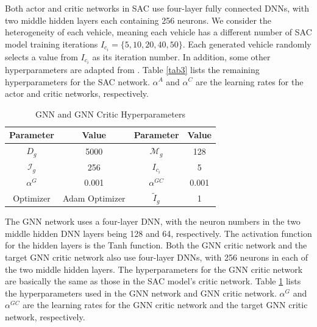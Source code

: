 \documentclass[lettersize,journal,onecolumn]{IEEEtran}
\begin{document}
Both actor and critic networks in SAC use four-layer fully connected DNNs, with two middle hidden layers each containing 256 neurons. We consider the heterogeneity of each vehicle, meaning each vehicle has a different number of SAC model training iterations ${{I}_{{{c}_{i}}}}=\{5,10,20,40,50\}$. Each generated vehicle randomly selects a value from ${{I}_{{{c}_{i}}}}$ as its iteration number. In addition, some other hyperparameters are adapted from \cite{ref31}. Table \ref{tab3} lists the remaining hyperparameters for the SAC network. ${{\alpha }^{A}}$ and ${{\alpha }^{C}}$ are the learning rates for the actor and critic networks, respectively. 
\begin{table}
	\caption{GNN and GNN Critic Hyperparameters}
	\label{tab4}
	\footnotesize
	\centering
	\begin{tabular}{|c|c|c|c|}
		\hline
		\textbf{Parameter} &\textbf{Value} &\textbf{Parameter} &\textbf{Value}\\
		\hline
		${{D}_{g}}$ & 5000 & ${{\mathcal{M}}_{g}}$ & 128 \\ 
		${{\mathcal{I}}_{g}}$ & 256 & ${{I}_{{{c}_{i}}}}$ & 5 \\ 
		${{\alpha}^{G}}$ & 0.001 & ${{\alpha}^{GC}}$ & 0.001 \\ 
		Optimizer & Adam Optimizer & ${{\tilde{I}}_{g}}$ & 1 
		\\ \hline
		\end{tabular}
\end{table}

The GNN network uses a four-layer DNN, with the neuron numbers in the two middle hidden DNN layers being 128 and 64, respectively. The activation function for the hidden layers is the Tanh function. Both the GNN critic network and the target GNN critic network also use four-layer DNNs, with 256 neurons in each of the two middle hidden layers. The hyperparameters for the GNN critic network are basically the same as those in the SAC model's critic network. Table \ref{tab4} lists the hyperparameters used in the GNN network and GNN critic network. ${{\alpha }^{G}}$ and ${{\alpha }^{GC}}$ are the learning rates for the GNN critic network and the target GNN critic network, respectively.
\end{document}
